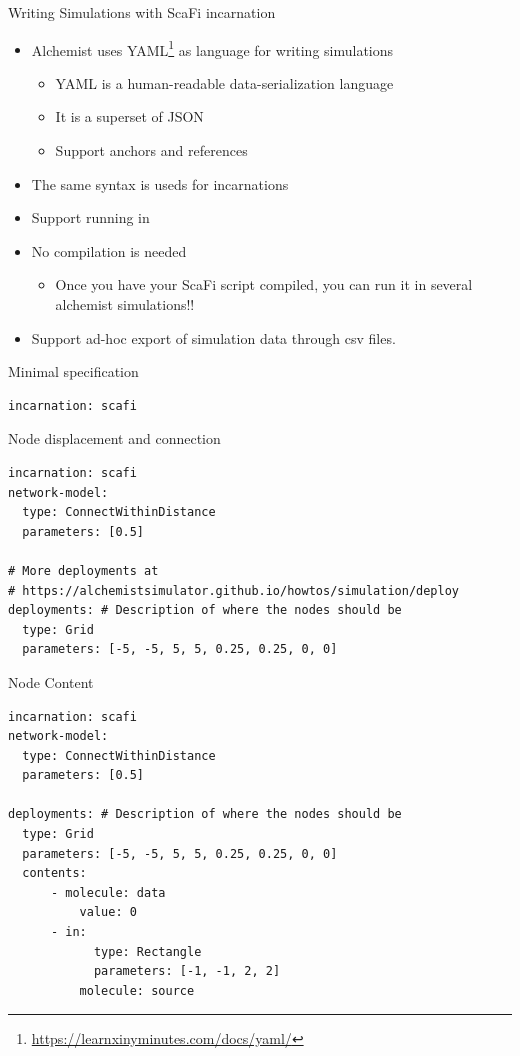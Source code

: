 \documentclass[presentation, 8pt]{beamer}\mode<presentation>{\usetheme{AMSBolognaFC}}
\begin{document}
\begin{frame}{Writing Simulations with ScaFi incarnation}
\begin{itemize}
	\item Alchemist uses YAML\footnote{\url{https://learnxinyminutes.com/docs/yaml/}} as language for writing simulations
	\begin{itemize}
		\item YAML is a human-readable data-serialization language
		\item It is a superset of JSON
		\item Support anchors and references
	\end{itemize}
	\item The same syntax is useds for  incarnations
	\item Support running in 
	\item No compilation is needed 
	\begin{itemize}
		\item[\faThumbsUp] Once you have your ScaFi script compiled, you can run it in several alchemist simulations!!
	\end{itemize}
	\item Support ad-hoc export of simulation data through csv files. 
\end{itemize}
\end{frame}
\begin{frame}[fragile]{Minimal specification}
\begin{verbatim}
incarnation: scafi
\end{verbatim}
\end{frame}
\begin{frame}[fragile]{Node displacement and connection}
\begin{verbatim}
incarnation: scafi
network-model:
  type: ConnectWithinDistance
  parameters: [0.5]

# More deployments at 
# https://alchemistsimulator.github.io/howtos/simulation/deploy
deployments: # Description of where the nodes should be
  type: Grid
  parameters: [-5, -5, 5, 5, 0.25, 0.25, 0, 0]
\end{verbatim}
\end{frame}
\begin{frame}[fragile]{Node Content}
	\begin{verbatim}
incarnation: scafi
network-model:
  type: ConnectWithinDistance
  parameters: [0.5]

deployments: # Description of where the nodes should be
  type: Grid
  parameters: [-5, -5, 5, 5, 0.25, 0.25, 0, 0]
  contents:
	  - molecule: data
		  value: 0
	  - in:
		  	type: Rectangle
		  	parameters: [-1, -1, 2, 2]
		  molecule: source
\end{verbatim}
\end{frame}
\end{document}
